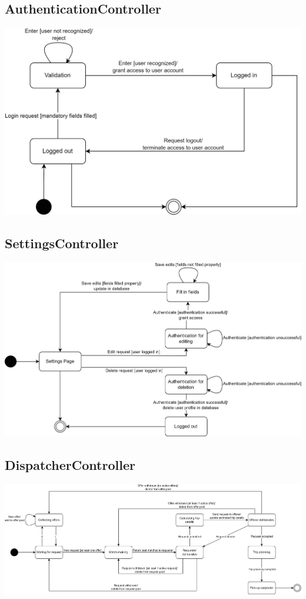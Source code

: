 \documentclass[]{article}
\begin{document}
\subsection*{AuthenticationController}
\includegraphics{StateCharts/Authentication.png}

\subsection*{SettingsController}
\includegraphics[scale=0.85]{StateCharts/Settings.png}

\subsection*{DispatcherController}
\includegraphics[scale=0.6]{StateCharts/Dispatcher.png}
\end{document}
